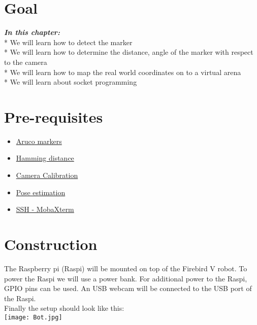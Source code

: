 \documentclass[]{article}
\date{}
\providecommand{\tightlist}{%
  \setlength{\itemsep}{0pt}\setlength{\parskip}{0pt}}
\begin{document}
\section{Goal}\label{goal}

\textbf{\emph{In this chapter:}}\\
* We will learn how to detect the marker\\
* We will learn how to determine the distance, angle of the marker with respect to the camera\\
* We will learn how to map the real world coordinates on to a virtual arena \\
* We will learn about socket programming

\section{Pre-requisites}\label{pre-requisites}

\begin{itemize}
\tightlist
\item
  \href{https://github.com/eyantrainternship/eYSIP_2015_Marker_based_Robot_Localisation/wiki/ArUco-Markers}{Aruco
  markers}
\item
  \href{https://www.google.co.in/url?sa=t\&rct=j\&q=\&esrc=s\&source=web\&cd=5\&ved=0CDYQFjAE\&url=https\%3A\%2F\%2Fen.wikipedia.org\%2Fwiki\%2FHamming_distance\&ei=BE6cVcWyEoaJuwTB94LgDA\&usg=AFQjCNFSM3VMSv1QOWQPVYax0JHs_yf5Ww\&sig2=TZGcg4nvTEBwxxL35O0ycQ}{Hamming
  distance}
\item
  \href{https://github.com/eyantrainternship/eYSIP_2015_Marker_based_Robot_Localisation/wiki/Camera-Calibration}{Camera
  Calibration}
\item
  \href{https://github.com/eyantrainternship/eYSIP_2015_Marker_based_Robot_Localisation/wiki/Pose-Estimation}{Pose
  estimation}
\item
  \href{https://www.google.co.in/url?sa=t\&rct=j\&q=\&esrc=s\&source=web\&cd=1\&cad=rja\&uact=8\&ved=0CB4QFjAA\&url=http\%3A\%2F\%2Fmobaxterm.mobatek.net\%2F\&ei=nU-cVaetMc22uAT8w4OgDA\&usg=AFQjCNFIes6M8iS_0iHFNFymtm-GbRSZow\&sig2=fywu_0EqUwUPuvxFg2kVMQ}{SSH
  - MobaXterm}
\end{itemize}

\section{Construction}\label{construction}

The Raspberry pi (Raspi) will be mounted on top of the Firebird V robot.
To power the Raspi we will use a power bank. For additional power to the
Raspi, GPIO pins can be used. An USB webcam will be connected to the USB
port of the Raspi.\\
Finally the setup should look like this:\\
 \texttt{[image: Bot.jpg]}
\end{document}
